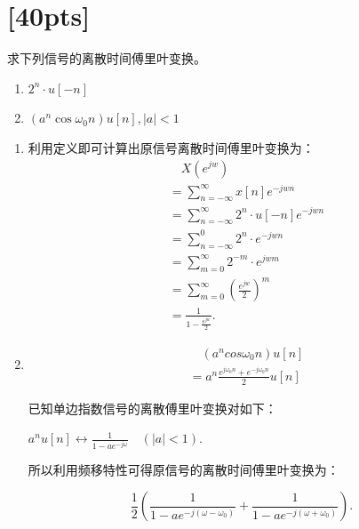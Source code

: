 \documentclass[a4paper,UTF8]{article}
\numberwithin{equation}{section}
\begin{document}
\newpage
\section{[40pts]}
求下列信号的离散时间傅里叶变换。
\begin{enumerate}[(1)]
    \item $2^{n}\cdot u[-n]$
    \item $(a^{n}\cos{\omega_{0}n})u[n],\left | a \right | < 1$
\end{enumerate}

\begin{framed}
    \begin{enumerate}[(1)]
		\item 
		利用定义即可计算出原信号离散时间傅里叶变换为：
		\begin{align*}
&\quad X(e^{jw}) \\
&= \sum\limits_{n = -\infty}^{\infty}x[n]e^{-jwn}\\
&= \sum\limits_{n = -\infty}^{\infty}2^n\cdot u[-n] e^{-jwn}\\
&= \sum\limits_{n = -\infty}^{0}2^n\cdot e^{-jwn}\\
&= \sum\limits_{m = 0}^{\infty}2^{-m}\cdot e^{jwm}\\
&= \sum\limits_{m = 0}^{\infty}{(\frac{e^{jw}}{2})}^m\\
&= \frac{1}{1-\frac{e^{jw}}{2}}.
		\end{align*}

		\item
		\begin{align*}
&\quad (a^ncos\omega_0n)u[n] \\
&= a^n \frac{e^{j\omega_0n} + e^{-j\omega_0n}}{2}u[n]
		\end{align*}
		
		已知单边指数信号的离散傅里叶变换对如下：
		
		$a^nu[n]  \leftrightarrow \frac{1}{1-ae^{-j\omega}} \quad(|a| < 1)$.
		
		所以利用频移特性可得原信号的离散时间傅里叶变换为：
		
		\[\frac{1}{2}(\frac{1}{1-ae^{-j(\omega-\omega_0)}} + \frac{1}{1-ae^{-j(\omega+\omega_0)}}).\]
		
    \end{enumerate}
\end{framed}
\end{document}
